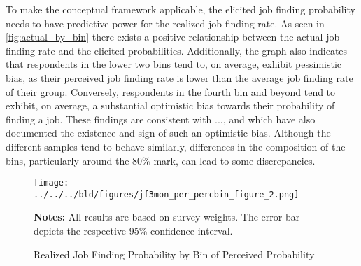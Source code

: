\documentclass[11pt,a4paper,leqno]{article}
\begin{document}
To make the conceptual framework applicable, the elicited job finding probability needs to have predictive power for the realized job finding rate. As seen in \autoref{fig:actual_by_bin} there exists a positive relationship between the actual job finding rate and the elicited probabilities. Additionally, the graph also indicates that respondents in the lower two bins tend to, on average, exhibit pessimistic bias, as their perceived job finding rate is lower than the average job finding rate of their group. Conversely, respondents in the fourth bin and beyond tend to exhibit, on average,  a substantial optimistic bias towards their probability of finding a job. 
These findings are consistent with ..., \textcite{Spinne2015} and  \textcite{Baleer2021} which have also documented the existence and sign of such an optimistic bias. Although the different samples tend to behave similarly, differences in the composition of the bins, particularly around the 80\% mark, can lead to some discrepancies.

\begin{figure}[!htbp] \centering
	\texttt{[image: ../../../bld/figures/jf3mon\_per\_percbin\_figure\_2.png]}
	\begin{minipage}[center]{\textwidth}
		\caption*{ \scriptsize \textbf{Notes:} All results are based on survey weights. The error bar depicts the respective 95\% confidence interval.}
	\end{minipage}
	\caption{Realized Job Finding Probability by Bin of Perceived Probability}
	\label{fig:actual_by_bin}
\end{figure}
\end{document}
